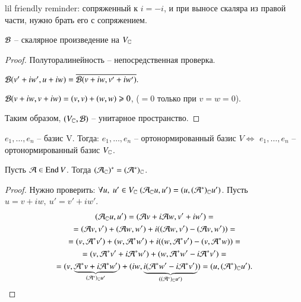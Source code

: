\documentclass[main]{subfiles}
\begin{document}
    lil friendly reminder: сопряженный к $i = -i$, и при выносе скаляра из правой части, нужно брать его с сопряжением.

    \begin{proposition}
        $\mathcal{B}$ -- скалярное произведение на $V_{\mathbb{C}}$
    \end{proposition}
    \begin{proof}
        Полуторалинейность -- непосредственная проверка. 

        $\mathcal{B}(v'+iw', u+iw) = \overline{\mathcal{B}(v + i w, v' + iw')}.$ 

        $\mathcal{B}(v + iw, v + iw) = (v, v) + (w, w) \geqslant 0$, ($=0$ только при $v = w = 0$).

        Таким образом, $(V_{\mathbb{C}}, \mathcal{B})$ -- унитарное пространство.
    \end{proof}

    \begin{remark}
         $e_1, \ldots, e_n$ -- базис V. Тогда: $e_1, \ldots, e_n$ -- ортонормированный базис $V \Leftrightarrow$  $e_1, \ldots, e_n$ -- ортонормированный базис $V_{\mathbb{C}}$.
    \end{remark}

    \begin{proposition}
        Пусть $\mathcal{A} \in \operatorname{End} V$. Тогда $(\mathcal{A}_{\mathbb{C}})^* = (\mathcal{A}^*)_{\mathbb{C}}$.
    \end{proposition}

    \begin{proof}
        Нужно проверить: $\forall u, \ u' \in V_{\mathbb{C}} \ (\mathcal{A}_{\mathbb{C}}u, u') = (u, (\mathcal{A}^*)_{\mathbb{C}} u')$. 
        Пусть  $u = v + iw, \ u' = v' + iw'$.
        \begin{multline*}
            (\mathcal{A}_{\mathbb{C}}u, u') = (\mathcal{A} v + i \mathcal{A} w, v' + iw') = \\
            = (\mathcal{A} v, v') + (\mathcal{A} w, w') + i((\mathcal{A} w, v') - (\mathcal{A} v, w')) = \\
            = (v, \mathcal{A}^* v') + (w, \mathcal{A}^* w') + i((w, \mathcal{A}^* v') - (v, \mathcal{A}^*w)) = \\
            = (v, \mathcal{A}^*v' + i\mathcal{A}^*w') + (w, \mathcal{A}^*w' - i\mathcal{A}^* v') = \\
            = (v, \underbrace{\mathcal{A}^*v+ i\mathcal{A}^* w'}_{(\mathcal{A}^*)_{\mathbb{C}}u'}) + (iw, \underbrace{i(\mathcal{A}^*w'-i\mathcal{A}^*v')}_{((\mathcal{A}^*)_{\mathbb{C}}u')}) = (u, (\mathcal{A}^*)_{\mathbb{C}} u').
        \end{multline*}
    \end{proof}
\end{document}

